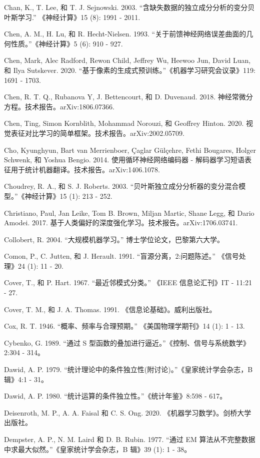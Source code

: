 \documentclass[10pt]{report}
\begin{document}
Chan, K., T. Lee, 和 T. J. Sejnowski. 2003. “含缺失数据的独立成分分析的变分贝叶斯学习.” 《神经计算》15 (8): 1991 - 2011.

Chen, A. M., H. Lu, 和 R. Hecht-Nielsen. 1993. “关于前馈神经网络误差曲面的几何性质。”《神经计算》5 (6): 910 - 927.

Chen, Mark, Alec Radford, Rewon Child, Jeffrey Wu, Heewoo Jun, David Luan, 和 Ilya Sutskever. 2020. “基于像素的生成式预训练。”《机器学习研究会议录》119: 1691 - 1703.

Chen, R. T. Q., Rubanova Y, J. Bettencourt, 和 D. Duvenaud. 2018. 神经常微分方程。技术报告。arXiv:1806.07366.

Chen, Ting, Simon Kornblith, Mohammad Norouzi, 和 Geoffrey Hinton. 2020. 视觉表征对比学习的简单框架。技术报告。arXiv:2002.05709.

Cho, Kyunghyun, Bart van Merrienboer, Çaglar Gülçehre, Fethi Bougares, Holger Schwenk, 和 Yoshua Bengio. 2014. 使用循环神经网络编码器 - 解码器学习短语表征用于统计机器翻译。技术报告。arXiv:1406.1078.

Choudrey, R. A., 和 S. J. Roberts. 2003. “贝叶斯独立成分分析器的变分混合模型。”《神经计算》15 (1): 213 - 252.

Christiano, Paul, Jan Leike, Tom B. Brown, Miljan Martic, Shane Legg, 和 Dario Amodei. 2017. 基于人类偏好的深度强化学习。技术报告。arXiv:1706.03741.

Collobert, R. 2004. “大规模机器学习。” 博士学位论文，巴黎第六大学。

Comon, P., C. Jutten, 和 J. Herault. 1991. “盲源分离，2:问题陈述。” 《信号处理》24 (1): 11 - 20.

Cover, T., 和 P. Hart. 1967. “最近邻模式分类。” 《IEEE 信息论汇刊》IT - 11:21 - 27.

Cover, T. M., 和 J. A. Thomas. 1991. 《信息论基础》。威利出版社。

Cox, R. T. 1946. “概率、频率与合理预期。” 《美国物理学期刊》14 (1): 1 - 13.

Cybenko, G. 1989. “通过 S 型函数的叠加进行逼近。”《控制、信号与系统数学》2:304 - 314。

Dawid, A. P. 1979. “统计理论中的条件独立性(附讨论)。”《皇家统计学会杂志，B 辑》4:1 - 31。

Dawid, A. P. 1980. “统计运算的条件独立性。”《统计年鉴》8:598 - 617。

Deisenroth, M. P., A. A. Faisal 和 C. S. Ong. 2020. 《机器学习数学》。剑桥大学出版社。

Dempster, A. P., N. M. Laird 和 D. B. Rubin. 1977. “通过 EM 算法从不完整数据中求最大似然。”《皇家统计学会杂志，B 辑》39 (1): 1 - 38。
\end{document}
